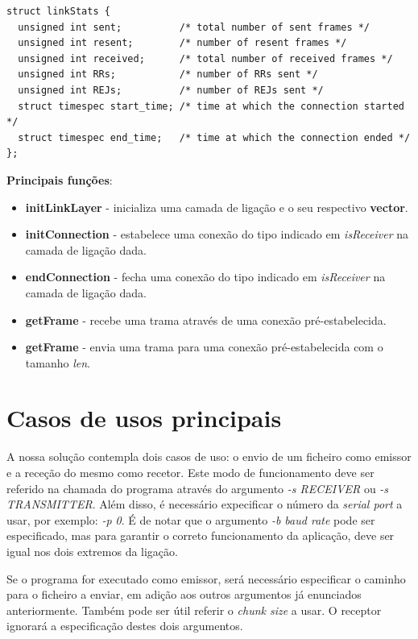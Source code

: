 \documentclass[11pt]{report}
\begin{document}
\begin{lstlisting}
struct linkStats {
  unsigned int sent;          /* total number of sent frames */
  unsigned int resent;        /* number of resent frames */
  unsigned int received;      /* total number of received frames */
  unsigned int RRs;           /* number of RRs sent */
  unsigned int REJs;          /* number of REJs sent */
  struct timespec start_time; /* time at which the connection started */
  struct timespec end_time;   /* time at which the connection ended */
};
\end{lstlisting}

\textbf{Principais funções}:
\begin{itemize}
\item \textbf{initLinkLayer} - inicializa uma camada de ligação e o seu
respectivo \textbf{vector}.
\item \textbf{initConnection} - estabelece uma conexão do tipo indicado em
\textit{isReceiver} na camada de ligação dada.
\item \textbf{endConnection} - fecha uma conexão do tipo indicado em
\textit{isReceiver} na camada de ligação dada.
\item \textbf{getFrame} - recebe uma trama através de uma conexão pré-estabelecida.
\item \textbf{getFrame} - envia uma trama para uma conexão pré-estabelecida com
o tamanho \textit{len}.
\end{itemize}

{\let\clearpage\relax \chapter{Casos de usos principais}}

A nossa solução contempla dois casos de uso: o envio de um ficheiro como emissor
e a receção do mesmo como recetor. Este modo de funcionamento deve ser referido
na chamada do programa através do argumento \textit{-s RECEIVER} ou
\textit{-s TRANSMITTER}. Além disso, é necessário expecificar o número da
\textit{serial port} a usar, por exemplo: \textit{-p 0}. É de notar que o
argumento \textit{-b baud rate} pode ser especificado, mas para garantir o
correto funcionamento da aplicação, deve ser igual nos dois extremos da ligação.

Se o programa for executado como emissor, será necessário especificar o caminho
para o ficheiro a enviar, em adição aos outros argumentos já enunciados
anteriormente. Também pode ser útil referir o \textit{chunk size} a usar. O
receptor ignorará a especificação destes dois argumentos.
\end{document}

